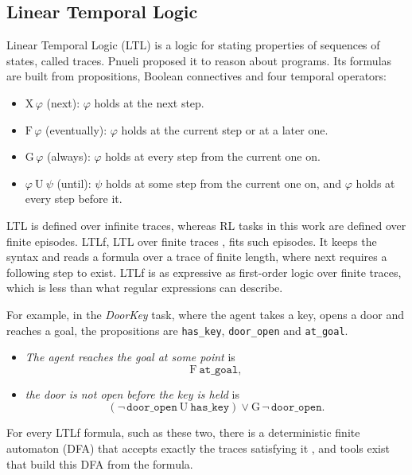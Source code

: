 \documentclass[11pt,english,listoffigures,listoftables]{tfgetsinf}
\newcommand{\env}[1]{\textsf{\slshape #1}}  %
\begin{document}
\subsection{Linear Temporal Logic}
\label{sec:sota-ltl}
Linear Temporal Logic (LTL) is a logic for stating properties of sequences of states, called traces. Pnueli \cite{pnueli1977temporal} proposed it to reason about programs. Its formulas are built from propositions, Boolean connectives and four temporal operators:
\begin{itemize}
    \item $\mathrm{X}\,\varphi$ (next): $\varphi$ holds at the next step.
    \item $\mathrm{F}\,\varphi$ (eventually): $\varphi$ holds at the current step or at a later one.
    \item $\mathrm{G}\,\varphi$ (always): $\varphi$ holds at every step from the current one on.
    \item $\varphi\ \mathrm{U}\ \psi$ (until): $\psi$ holds at some step from the current one on, and $\varphi$ holds at every step before it.
\end{itemize}
LTL is defined over infinite traces, whereas RL tasks in this work are defined over finite episodes. LTLf, LTL over finite traces \cite{degiacomo2013linear}, fits such episodes. It keeps the syntax and reads a formula over a trace of finite length, where next requires a following step to exist. LTLf is as expressive as first-order logic over finite traces, which is less than what regular expressions can describe.

For example, in the \env{DoorKey} task, where the agent takes a key, opens a door and reaches a goal, the propositions are \texttt{has\_key}, \texttt{door\_open} and \texttt{at\_goal}. 

\begin{itemize}
    \item  \textit{The agent reaches the goal at some point} is
    \[ \mathrm{F}\ \texttt{at\_goal}, \]
    \item \textit{the door is not open before the key is held} is
    \[ (\neg\,\texttt{door\_open}\ \mathrm{U}\ \texttt{has\_key}) \lor \mathrm{G}\,\neg\,\texttt{door\_open}. \]
\end{itemize}

For every LTLf formula, such as these two, there is a deterministic finite automaton (DFA) that accepts exactly the traces satisfying it \cite{degiacomo2013linear}, and tools exist that build this DFA from the formula.
\end{document}
